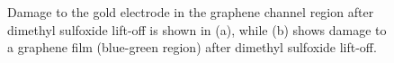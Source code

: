 \documentclass[
  letterpaper,
  DIV=11,
  numbers=noendperiod]{scrartcl}
\begin{document}
\begin{figure}
\begin{minipage}[t]{0.47\linewidth}
{{}

}

\subcaption{\label{fig-graphene-dmso-damage}}
\end{minipage}%

\caption{\label{fig-dmso-damage}Damage to the gold electrode in the
graphene channel region after dimethyl sulfoxide lift-off is shown in
(a), while (b) shows damage to a graphene film (blue-green region) after
dimethyl sulfoxide lift-off.}

\end{figure}

\begin{figure}

\begin{minipage}[t]{0.47\linewidth}

{\centering 


}

\subcaption{\label{fig-dektat-cr}}
\end{minipage}%
%
\begin{minipage}[t]{0.05\linewidth}

{\centering 

~

}

\end{minipage}%
%
\begin{minipage}[t]{0.47\linewidth}


\end{minipage}
\end{figure}
\end{document}
